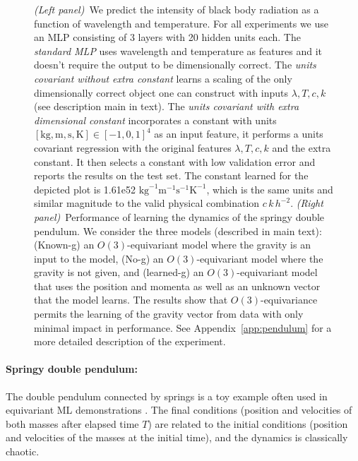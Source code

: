 \documentclass[preprint]{article} %
\newcommand{\appref}[1]{Appendix~\ref{#1}}
\newcommand{\unit}[1]{\mathrm{#1}}
\newcommand{\kg}{\unit{kg}}
\newcommand{\m}{\unit{m}}
\newcommand{\s}{\unit{s}}
\newcommand{\K}{\unit{K}}
\begin{document}
\begin{figure}[t!]
    \caption{\textsl{(Left panel)}~We predict the intensity of black body radiation as a function of wavelength and temperature. For all experiments we use an MLP consisting of 3 layers with 20 hidden units each. The \emph{standard MLP} uses wavelength and temperature as features and it doesn't require the output to be dimensionally correct. The \emph{units covariant without extra constant} learns a scaling of the only dimensionally correct object one can construct with inputs $\lambda, T, c, k$ (see description main in text). The \emph{units covariant with extra dimensional constant} incorporates a constant with units $[\kg, \m, \s, \K]\in[-1,0,1]^4$ as an input feature, it performs a units covariant regression with the original features $\lambda, T, c, k$ and the extra constant. It then selects a constant with low validation error and reports the results on the test set. The constant learned for the depicted plot is 1.61e52 $\kg^{-1}\m^{-1}\s^{-1}\K^{-1}$, which is the same units and similar magnitude to the valid physical combination $c\,k\,h^{-2}$.
    \textsl{(Right panel)}~Performance of learning the dynamics of the springy double pendulum. We consider the three models (described in main text): (Known-g) an $O(3)$-equivariant model where the gravity is an input to the model, (No-g) an $O(3)$-equivariant model where the gravity is not given, and (learned-g) an $O(3)$-equivariant model that uses the position and momenta as well as an unknown vector that the model learns. The results show that $O(3)$-equivariance permits the learning of the gravity vector from data with only minimal impact in performance. See \appref{app:pendulum} for a more detailed description of the experiment.}
    \label{fig:exps}
\end{figure}

\paragraph{Springy double pendulum:}
The double pendulum connected by springs is a toy example often used in equivariant ML demonstrations \citep{finzi2021practical,yao2021simple, villar2022dimensionless}. 
The final conditions (position and velocities of both masses after elapsed time $T$) are related to the initial conditions (position and velocities of the masses at the initial time), and the dynamics is classically chaotic.
\end{document}
